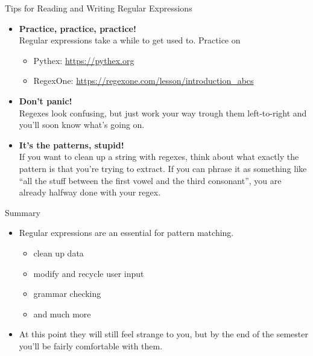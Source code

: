 \documentclass[professionalfonts, xcolor={usenames,svgnames,x11names,table}]{beamer}
\begin{document}
\begin{frame}{Tips for Reading and Writing Regular Expressions}
    \begin{itemize}
        \item \textbf{Practice, practice, practice!}\\
            Regular expressions take a while to get used to.
            Practice on
            \begin{itemize}
                \item Pythex: \url{https://pythex.org}
                \item RegexOne: \url{https://regexone.com/lesson/introduction_abcs}
            \end{itemize}
        \item \textbf{Don't panic!}\\
            Regexes look confusing, but just work your way trough them left-to-right and you'll soon know what's going on.
        \item \textbf{It's the patterns, stupid!}\\
            If you want to clean up a string with regexes, think about what exactly the pattern is that you're trying to extract.
            If you can phrase it as something like ``all the stuff between the first vowel and the third consonant'', you are already halfway done with your regex.
    \end{itemize}
\end{frame}

\begin{frame}{Summary}
    \begin{itemize}
        \item Regular expressions are an essential for pattern matching.
            \begin{itemize}
                \item clean up data
                \item modify and recycle user input
                \item grammar checking
                \item and much more
            \end{itemize}
        \item At this point they will still feel strange to you, but by the end of the semester
              you'll be fairly comfortable with them.
    \end{itemize}
\end{frame}
\end{document}
